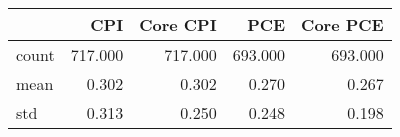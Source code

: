 \begin{tabular}{lrrrr}
\toprule
{} &      CPI &  Core CPI &      PCE &  Core PCE \\
\midrule
count &  717.000 &   717.000 &  693.000 &   693.000 \\
mean  &    0.302 &     0.302 &    0.270 &     0.267 \\
std   &    0.313 &     0.250 &    0.248 &     0.198 \\
\bottomrule
\end{tabular}

